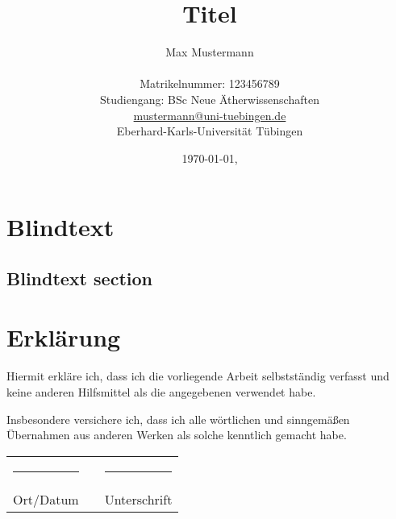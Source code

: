 \documentclass[
  11pt,
  bibliography=totoc,
  numbers=noenddot,
  ]{scrbook}
\title{Titel}
\author{{\LARGE Max Mustermann} \\
  \\
  Matrikelnummer: 123456789\\
  Studiengang: BSc Neue Ätherwissenschaften \\
  \url{mustermann@uni-tuebingen.de}\\ 
  Eberhard-Karls-Universität Tübingen\\}
\date{\ddmmyyyydate\today, \currenttime}
\begin{document}
\maketitle
\frontmatter
\tableofcontents
\mainmatter 



\chapter{Blindtext}

\lipsum

\section{Blindtext section}

\lipsum


\insertBib

\chapter*{Erklärung}

Hiermit erkläre ich, dass ich die vorliegende Arbeit selbstständig verfasst und keine anderen Hilfsmittel als die angegebenen verwendet habe.

Insbesondere versichere ich, dass ich alle wörtlichen und sinngemäßen Übernahmen aus anderen Werken als solche kenntlich gemacht habe.

\vspace{10ex}

\noindent
\begin{tabular}{lcl}
  \rule{6cm}{1pt} & \hspace{1cm} & \rule{6cm}{1pt} \\
  Ort/Datum & & Unterschrift
\end{tabular}
\end{document}
